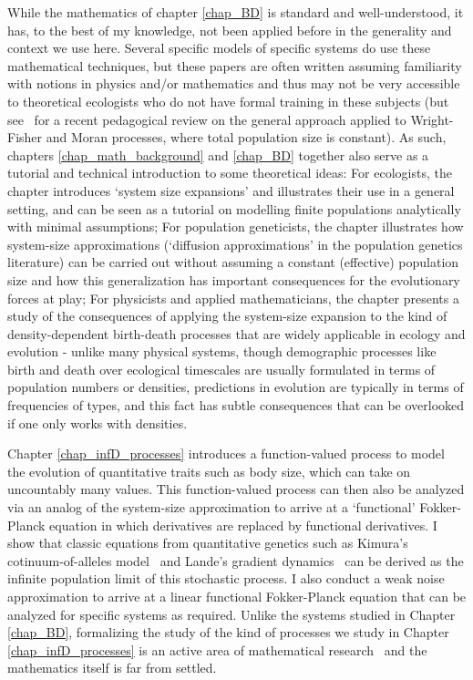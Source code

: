 While the mathematics of chapter \ref{chap_BD} is standard and well-understood, it has, to the best of my knowledge, not been applied before in the generality and context we use here. Several specific models of specific systems do use these mathematical techniques, but these papers are often written assuming familiarity with notions in physics and/or mathematics and thus may not be very accessible to theoretical ecologists who do not have formal training in these subjects (but see~\citet{czuppon_understanding_2021} for a recent pedagogical review on the general approach applied to Wright-Fisher and Moran processes, where total population size is constant). As such, chapters \ref{chap_math_background} and \ref{chap_BD} together also serve as a tutorial and technical introduction to some theoretical ideas: For ecologists, the chapter introduces `system size expansions' and illustrates their use in a general setting, and can be seen as a tutorial on modelling finite populations analytically with minimal assumptions; For population geneticists, the chapter illustrates how system-size approximations (`diffusion approximations' in the population genetics literature) can be carried out without assuming a constant (effective) population size and how this generalization has important consequences for the evolutionary forces at play; For physicists and applied mathematicians, the chapter presents a study of the consequences of applying the system-size expansion to the kind of density-dependent birth-death processes that are widely applicable in ecology and evolution - unlike many physical systems, though demographic processes like birth and death over ecological timescales are usually formulated in terms of population numbers or densities, predictions in evolution are typically in terms of frequencies of types, and this fact has subtle consequences that can be overlooked if one only works with densities.

Chapter \ref{chap_infD_processes} introduces a function-valued process to model the evolution of quantitative traits such as body size, which can take on uncountably many values. This function-valued process can then also be analyzed via an analog of the system-size approximation to arrive at a `functional' Fokker-Planck equation in which derivatives are replaced by functional derivatives. I show that classic equations from quantitative genetics such as Kimura's cotinuum-of-alleles model~\citep{kimura_stochastic_1965} and Lande's gradient dynamics~\citep{lande_quantitative_1982} can be derived as the infinite population limit of this stochastic process. I also conduct a weak noise approximation to arrive at a linear functional Fokker-Planck equation that can be analyzed for specific systems as required. Unlike the systems studied in Chapter \ref{chap_BD}, formalizing the study of the kind of processes we study in Chapter \ref{chap_infD_processes} is an active area of mathematical research~\citep{carmona_stochastic_1999,da_prato_stochastic_2014,prevot_concise_2007,liu_stochastic_2015,bogachev_fokker-planck-kolmogorov_2015,balan_gentle_2018} and the mathematics itself is far from settled.

